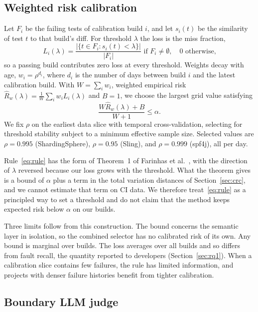 \subsection{Weighted risk calibration}
\label{sec:calibration}

Let $F_i$ be the failing tests of calibration build $i$, and let $s_i(t)$ be the similarity of test $t$ to that build's diff. For threshold $\lambda$ the loss is the miss fraction,
\begin{equation}
L_i(\lambda) = \frac{|\{t \in F_i : s_i(t) < \lambda\}|}{|F_i|} \text{ if } F_i \neq \emptyset,\quad 0 \text{ otherwise,}
\end{equation}
so a passing build contributes zero loss at every threshold. Weights decay with age, $w_i = \rho^{d_i}$, where $d_i$ is the number of days between build $i$ and the latest calibration build. With $W = \sum_i w_i$, weighted empirical risk $\hat{R}_w(\lambda) = \frac{1}{W}\sum_i w_i L_i(\lambda)$ and $B = 1$, we choose the largest grid value satisfying
\begin{equation}
\frac{W \hat{R}_w(\lambda) + B}{W + 1} \le \alpha.
\label{eq:rule}
\end{equation}
We fix $\rho$ on the earliest data slice with temporal cross-validation, selecting for threshold stability subject to a minimum effective sample size. Selected values are $\rho = 0.995$ (ShardingSphere), $\rho = 0.95$ (Sling), and $\rho = 0.999$ (spf4j), all per day.

Rule~\eqref{eq:rule} has the form of Theorem~1 of Farinhas et al.~\cite{farinhas2024nonexchangeable}, with the direction of $\lambda$ reversed because our loss grows with the threshold. What the theorem gives is a bound of $\alpha$ plus a term in the total variation distances of Section~\ref{sec:crc}, and we cannot estimate that term on CI data. We therefore treat~\eqref{eq:rule} as a principled way to set a threshold and do not claim that the method keeps expected risk below $\alpha$ on our builds.

Three limits follow from this construction. The bound concerns the semantic layer in isolation, so the combined selector has no calibrated risk of its own. Any bound is marginal over builds. The loss averages over all builds and so differs from fault recall, the quantity reported to developers (Section~\ref{sec:rq1}). When a calibration slice contains few failures, the rule has limited information, and projects with denser failure histories benefit from tighter calibration.

\subsection{Boundary LLM judge}
\label{sec:judge}

